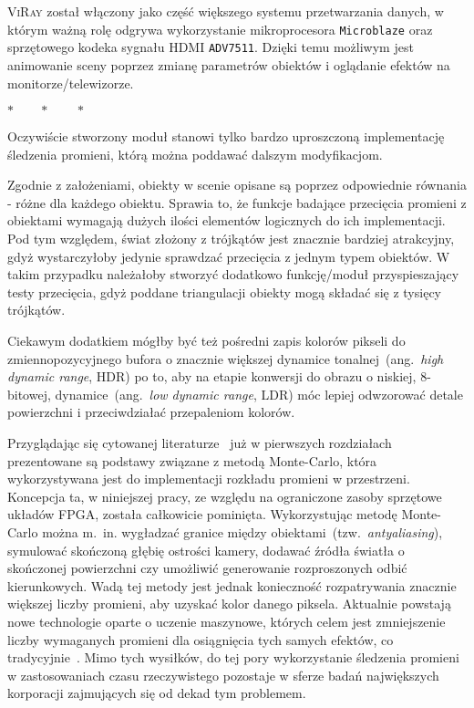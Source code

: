 \textsc{ViRay} został włączony jako część większego systemu przetwarzania danych, w którym ważną rolę odgrywa wykorzystanie mikroprocesora \texttt{Microblaze} oraz sprzętowego kodeka sygnału HDMI \texttt{ADV7511}. Dzięki temu możliwym jest animowanie sceny poprzez zmianę parametrów obiektów i oglądanie efektów na monitorze/telewizorze.

\begin{center}
$*\qquad *\qquad *$
\end{center}

Oczywiście stworzony moduł stanowi tylko bardzo uproszczoną implementację śledzenia promieni, którą można poddawać dalszym modyfikacjom. 

Zgodnie z założeniami, obiekty w scenie opisane są poprzez odpowiednie równania - różne dla każdego obiektu. Sprawia to, że funkcje badające przecięcia promieni z obiektami wymagają dużych ilości elementów logicznych do ich implementacji. Pod tym względem, świat złożony z trójkątów jest znacznie bardziej atrakcyjny, gdyż wystarczyłoby jedynie sprawdzać przecięcia z jednym typem obiektów. W takim przypadku należałoby stworzyć dodatkowo funkcję/moduł przyspieszający testy przecięcia, gdyż poddane triangulacji obiekty mogą składać się z tysięcy trójkątów.

Ciekawym dodatkiem mógłby być też pośredni zapis kolorów pikseli do zmiennopozycyjnego bufora o znacznie większej dynamice tonalnej~(ang.~\textit{high dynamic range}, HDR) po to, aby na etapie konwersji do obrazu o niskiej, 8-bitowej, dynamice~(ang.~\textit{low dynamic range}, LDR) móc lepiej odwzorować detale powierzchni i przeciwdziałać przepaleniom kolorów.

Przyglądając się cytowanej literaturze~\cite{PBRT}\cite{RTFTGU} już w pierwszych rozdziałach prezentowane są podstawy związane z metodą Monte-Carlo, która wykorzystywana jest do implementacji rozkładu promieni w przestrzeni. Koncepcja ta, w niniejszej pracy, ze względu na ograniczone zasoby sprzętowe układów FPGA, została całkowicie pominięta. Wykorzystując metodę Monte-Carlo można m.~in. wygładzać granice między obiektami~(tzw.~\textit{antyaliasing}), symulować skończoną głębię ostrości kamery, dodawać źródła światła o skończonej powierzchni czy umożliwić generowanie rozproszonych odbić kierunkowych. Wadą tej metody jest jednak konieczność rozpatrywania znacznie większej liczby promieni, aby uzyskać kolor danego piksela. Aktualnie powstają nowe technologie oparte o uczenie maszynowe, których celem jest zmniejszenie liczby wymaganych promieni dla osiągnięcia tych samych efektów, co tradycyjnie~\cite{NVIDIA_JENSEN}\cite{NVIDIA_DEMO}. Mimo tych wysiłków, do tej pory wykorzystanie śledzenia promieni w zastosowaniach czasu rzeczywistego pozostaje w sferze badań największych korporacji zajmujących się od dekad tym problemem.


